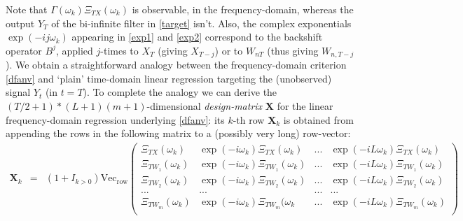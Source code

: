 \documentclass[11pt]{article}
\begin{document}
Note that $\Gamma(\omega_k)\Xi_{TX}(\omega_k)$ is observable, in the frequency-domain, whereas the output $Y_T$ of the bi-infinite filter in \ref{target} isn't. Also, the complex exponentials $\exp(-ij\omega_k)$ appearing in \ref{exp1} and \ref{exp2} correspond to the backshift operator $B^j$, applied $j$-times to $X_{T}$ (giving $X_{T-j}$) or to $W_{nT}$ (thus giving $W_{n,T-j}$). We obtain a straightforward analogy between the frequency-domain criterion \ref{dfanv} and `plain' time-domain linear regression targeting 
the (unobserved) signal $Y_t$ (in $t=T$). To complete the analogy we can derive the $(T/2+1)*(L+1)(m+1)$-dimensional \emph{design-matrix} $\mathbf{X}$ for the linear frequency-domain regression underlying \ref{dfanv}: its $k$-th row $\mathbf{X}_k$  is obtained from appending the rows in the following matrix to a (possibly very long) row-vector: 
\begin{eqnarray}\label{desmat}
\mathbf{X}_k&=&(1+I_{k>0})\textrm{Vec}_\textrm{row}\left(\begin{array}{ccccc} \Xi_{TX}(\omega_k)& \exp(-i\omega_k)\Xi_{TX}(\omega_k)&...& \exp(-iL\omega_k)\Xi_{TX}(\omega_k)\\
 \Xi_{TW_1}(\omega_k)& \exp(-i\omega_k)\Xi_{TW_1}(\omega_k)& ...& \exp(-iL\omega_k)\Xi_{TW_1}(\omega_k)\\
 \Xi_{TW_2}(\omega_k)& \exp(-i\omega_k)\Xi_{TW_2}(\omega_k)& ...& \exp(-iL\omega_k)\Xi_{TW_2}(\omega_k)\\
...&...&...&...\\
 \Xi_{TW_m}(\omega_k)& \exp(-i\omega_k)\Xi_{TW_m}(\omega_k&...& \exp(-iL\omega_k)\Xi_{TW_m}(\omega_k)\\
\end{array}\right)
\end{eqnarray}
\end{document}
